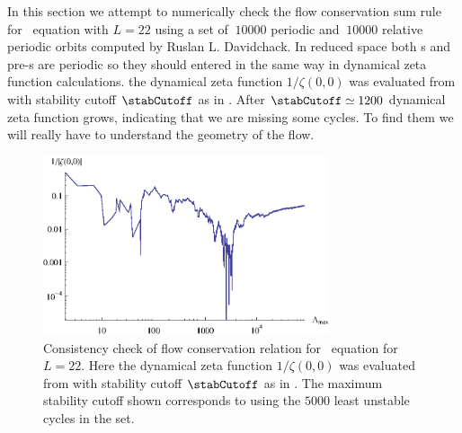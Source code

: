In this section we attempt to numerically check the
flow conservation sum rule  for \KS\ equation with $L=22$
using a set of $~10000$ periodic and $~10000$ relative
periodic orbits  computed by Ruslan L. Davidchack.
In reduced space both \rpo s and pre-\po s are periodic so they should
entered in the same way in dynamical zeta function calculations. the dynamical zeta function $1/\zeta(0,0)$ was evaluated
from  with stability cutoff $\stabCutoff$ as
in . After $\stabCutoff\simeq1200$
dynamical zeta function grows, indicating that we are missing some cycles.
To find them we will really have to understand the geometry of the flow.

\begin{figure}
    \vspace*{-5pt}
\begin{center}
	\includegraphics[width=0.75\textwidth]{../figs/ksStabOrder5000}
\end{center}
\caption[Flow conservation for \KS, $L=22$]
    {
Consistency check of flow conservation relation 
for \KS\ equation  for $L=22$.
Here the dynamical zeta function $1/\zeta(0,0)$ was evaluated
from  with stability cutoff $\stabCutoff$ as
in . The maximum stability cutoff shown corresponds
to using the $5000$ least unstable cycles in the set.
	}
\label{fig:zetaStabOrderKS22}
    \vspace*{-5pt}
\end{figure}



